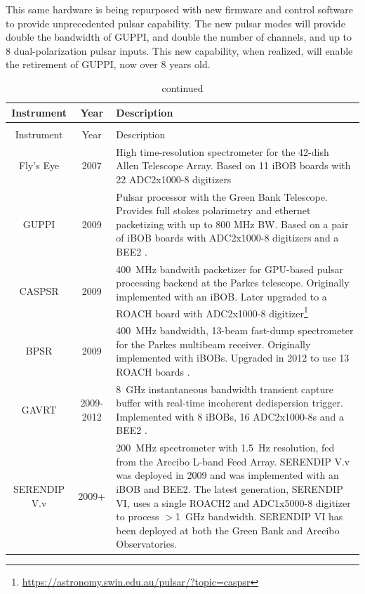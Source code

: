 \documentclass{ws-jai}
\begin{document}
This same hardware is being repurposed with new firmware and control
software to provide unprecedented pulsar capability.  The new pulsar
modes will provide double the bandwidth of GUPPI, and double the
number of channels, and up to 8 dual-polarization pulsar inputs.  This
new capability, when realized, will enable the retirement of GUPPI,
now over 8 years old.

\begin{longtable}{ccp{10cm}}
  \caption{Spectrometers and packetizers powered by CASPER hardware.}\\
  Instrument & Year & Description \\
  \hline \endfirsthead
  \caption[]{continued}\\
  Instrument & Year & Description \\
  \hline \endhead
  Fly's Eye        & 2007 & High time-resolution spectrometer for the 42-dish Allen Telescope Array. Based on 11 iBOB boards with 22 ADC2x1000-8 digitizers \citep{flyseye} \\
  GUPPI            & 2009 & Pulsar processor with the Green Bank Telescope. Provides full stokes polarimetry and ethernet packetizing with up to 800 MHz BW. Based on a pair of iBOB boards with ADC2x1000-8 digitizers and a BEE2 \citep{guppi}. \\
  CASPSR           & 2009 & 400~MHz bandwith packetizer for GPU-based pulsar processing backend at the Parkes telescope. Originally implemented with an iBOB. Later upgraded to a ROACH board with ADC2x1000-8 digitizer\footnote{\url{https://astronomy.swin.edu.au/pulsar/?topic=caspsr}} \\
  BPSR             & 2009 & 400~MHz bandwidth, 13-beam fast-dump spectrometer for the Parkes multibeam receiver. Originally implemented with iBOBs. Upgraded in 2012 to use 13 ROACH boards \citep{mcmahon-thesis, 2010MNRAS.409..619K}. \\
  GAVRT            & 2009-2012 & 8~GHz instantaneous bandwidth transient capture buffer with real-time incoherent dedispersion trigger. Implemented with 8 iBOBs, 16 ADC2x1000-8s and a BEE2 \citep{jon10, JonesDSS28}. \\
  SERENDIP V.v     & 2009+ & 200~MHz spectrometer with 1.5~Hz resolution, fed from the Arecibo L-band Feed Array. SERENDIP V.v was deployed in 2009 \citep{seti} and was implemented with an iBOB and BEE2. The latest generation, SERENDIP VI, uses a single ROACH2 and ADC1x5000-8 digitizer to process $>$1~GHz bandwidth. SERENDIP VI has been deployed at both the Green Bank and Arecibo Observatories. \\

\end{longtable}
\end{document}
